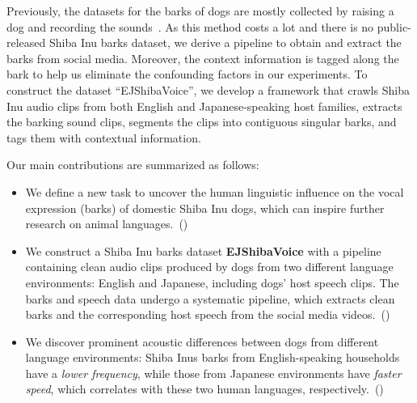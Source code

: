 Previously, the datasets for the barks of dogs are mostly collected by raising a dog and recording 
the sounds~\cite{ide2021rescue, ehsani2018let, molnar2008classification, hantke2018my}. As this method costs a lot and there is no public-released Shiba Inu barks dataset, 
we derive a pipeline to obtain and extract the barks from social media. Moreover, 
the context information is tagged along the bark to help us eliminate the confounding factors 
in our experiments. To construct the dataset ``EJShibaVoice'', we develop 
a framework that crawls Shiba Inu audio clips from both English and 
Japanese-speaking host families, extracts the barking sound clips, 
segments the clips into contiguous singular barks, and tags them with contextual information. 


Our main contributions are summarized as follows:

\begin{itemize}
	\item We define a new task to uncover the human linguistic influence 
on the vocal expression (barks) of domestic Shiba Inu dogs, 
which can inspire further research on animal 
languages.~()
	\item We construct a Shiba Inu barks dataset \textbf{EJShibaVoice} with a pipeline containing clean audio clips produced by dogs from two different language environments: English and Japanese, including dogs' host speech clips. 
The barks and speech data undergo a systematic pipeline, which extracts clean barks and 
the corresponding host speech from the social media videos.~()
	\item We discover prominent acoustic differences between dogs 
from different language environments: 
	Shiba Inus barks from English-speaking households have a \textit{lower frequency}, 
while those from Japanese environments have \textit{faster speed}, 
which correlates with these two human languages, respectively.~()%
\end{itemize}
